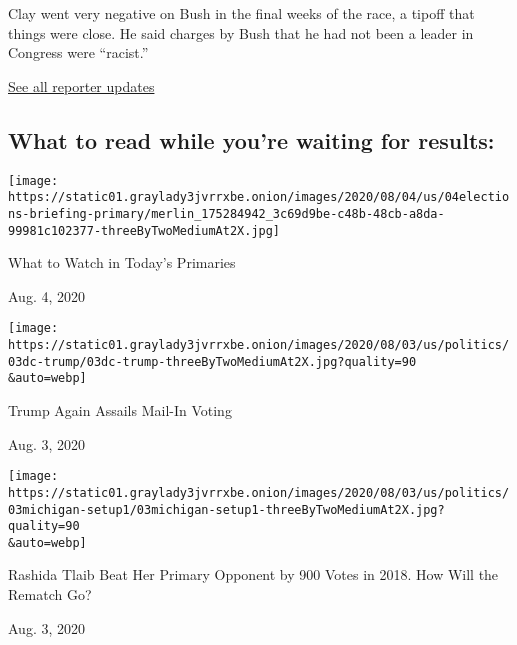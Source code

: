 Clay went very negative on Bush in the final weeks of the race, a tipoff
that things were close. He said charges by Bush that he had not been a
leader in Congress were ``racist.''

\href{https://www.nytimes3xbfgragh.onion/interactive/2020/08/04/us/elections/live-analysis-arizona-kansas-michigan-missouri-primaries.html?action=click\&module=ELEX_results\&pgtype=Interactive\&region=Component}{See
all reporter updates}

\hypertarget{what-to-read-while-youre-waiting-for-results}{%
\subsection{What to read while you're waiting for
results:}\label{what-to-read-while-youre-waiting-for-results}}

\href{https://www.nytimes3xbfgragh.onion/2020/08/04/us/elections/primary-election-michigan-arizona-kansas.html?action=click\&module=ELEX_results\&pgtype=Interactive\&region=RelatedCoverage}{}

\texttt{[image: https://static01.graylady3jvrrxbe.onion/images/2020/08/04/us/04elections-briefing-primary/merlin\_175284942\_3c69d9be-c48b-48cb-a8da-99981c102377-threeByTwoMediumAt2X.jpg]}

What to Watch in Today's Primaries

Aug. 4, 2020

\href{https://www.nytimes3xbfgragh.onion/2020/08/03/us/politics/trump-mail-in-voting.html?action=click\&module=ELEX_results\&pgtype=Interactive\&region=RelatedCoverage}{}

\texttt{[image: https://static01.graylady3jvrrxbe.onion/images/2020/08/03/us/politics/03dc-trump/03dc-trump-threeByTwoMediumAt2X.jpg?quality=90\\\&auto=webp]}

Trump Again Assails Mail-In Voting

Aug. 3, 2020

\href{https://www.nytimes3xbfgragh.onion/2020/08/03/us/politics/michigan-primary-rashida-tlaib-brenda-jones.html?action=click\&module=ELEX_results\&pgtype=Interactive\&region=RelatedCoverage}{}

\texttt{[image: https://static01.graylady3jvrrxbe.onion/images/2020/08/03/us/politics/03michigan-setup1/03michigan-setup1-threeByTwoMediumAt2X.jpg?quality=90\\\&auto=webp]}

Rashida Tlaib Beat Her Primary Opponent by 900 Votes in 2018. How Will
the Rematch Go?

Aug. 3, 2020

